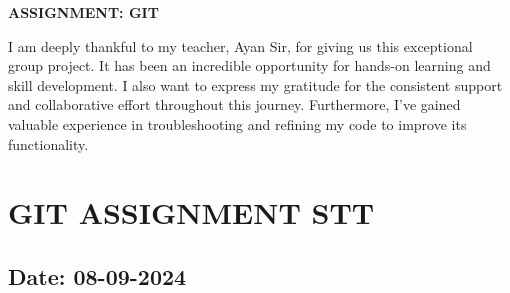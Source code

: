 \documentclass[12pt]{article}
\begin{document}
\begin{center}
\Huge \textbf{ASSIGNMENT: GIT}
\end{center}

I am deeply thankful to my teacher, Ayan Sir, for giving us this exceptional group project. It has been an incredible opportunity for hands-on learning and skill development. I also want to express my gratitude for the consistent support and collaborative effort throughout this journey. Furthermore, I've gained valuable experience in troubleshooting and refining my code to improve its functionality.


\newpage
\section{GIT ASSIGNMENT STT}
\subsection*{Date: 08-09-2024}
\end{document}
